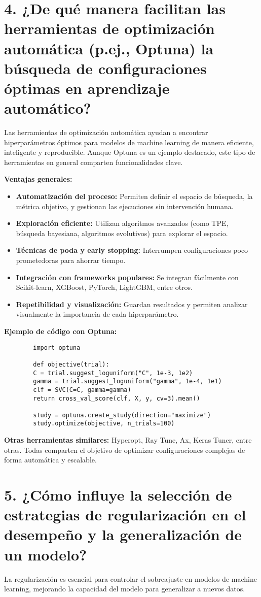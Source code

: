 \documentclass[a4paper,12pt]{article}
\begin{document}
	\section*{4. ¿De qué manera facilitan las herramientas de optimización automática (p.ej., Optuna) la búsqueda de configuraciones óptimas en aprendizaje automático?}
	Las herramientas de optimización automática ayudan a encontrar hiperparámetros óptimos para modelos de machine learning de manera eficiente, inteligente y reproducible. Aunque Optuna es un ejemplo destacado, este tipo de herramientas en general comparten funcionalidades clave.
	
	\textbf{Ventajas generales:}
	\begin{itemize}
		\item \textbf{Automatización del proceso:} Permiten definir el espacio de búsqueda, la métrica objetivo, y gestionan las ejecuciones sin intervención humana.
		\item \textbf{Exploración eficiente:} Utilizan algoritmos avanzados (como TPE, búsqueda bayesiana, algoritmos evolutivos) para explorar el espacio.
		\item \textbf{Técnicas de poda y early stopping:} Interrumpen configuraciones poco prometedoras para ahorrar tiempo.
		\item \textbf{Integración con frameworks populares:} Se integran fácilmente con Scikit-learn, XGBoost, PyTorch, LightGBM, entre otros.
		\item \textbf{Repetibilidad y visualización:} Guardan resultados y permiten analizar visualmente la importancia de cada hiperparámetro.
	\end{itemize}
	
	\textbf{Ejemplo de código con Optuna:}
	\begin{verbatim}
		import optuna
		
		def objective(trial):
		C = trial.suggest_loguniform("C", 1e-3, 1e2)
		gamma = trial.suggest_loguniform("gamma", 1e-4, 1e1)
		clf = SVC(C=C, gamma=gamma)
		return cross_val_score(clf, X, y, cv=3).mean()
		
		study = optuna.create_study(direction="maximize")
		study.optimize(objective, n_trials=100)
	\end{verbatim}
	
	\textbf{Otras herramientas similares:} Hyperopt, Ray Tune, Ax, Keras Tuner, entre otras. Todas comparten el objetivo de optimizar configuraciones complejas de forma automática y escalable.
	
	\section*{5. ¿Cómo influye la selección de estrategias de regularización en el desempeño y la generalización de un modelo?}
	La regularización es esencial para controlar el sobreajuste en modelos de machine learning, mejorando la capacidad del modelo para generalizar a nuevos datos.
	
\end{document}
